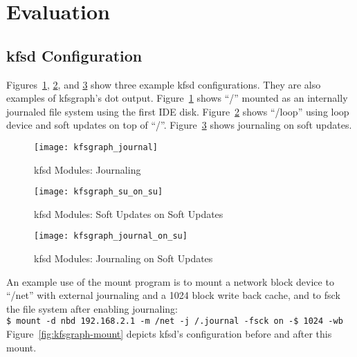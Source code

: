 \section{Evaluation}
\label{sec:eval}

\subsection{kfsd Configuration}
\label{sec:eval:configuration}

\newcommand{\kfsgraphscale}{0.5}

Figures~\ref{fig:kfsgraph-journal}, \ref{fig:kfsgraph-su-on-su}, and
\ref{fig:kfsgraph-journal-on-su} show three example kfsd configurations. They
are also examples of kfsgraph's dot output. Figure~\ref{fig:kfsgraph-journal}
shows ``/'' mounted as an internally journaled file system using the first IDE
disk. Figure~\ref{fig:kfsgraph-su-on-su} shows ``/loop'' using loop device and
soft updates on top of ``/''. Figure~\ref{fig:kfsgraph-journal-on-su} shows
journaling on soft updates.

\begin{figure}[htb]
\begin{center}
  \texttt{[image: kfsgraph\_journal]}
  \caption{kfsd Modules: Journaling}
  \label{fig:kfsgraph-journal}
\end{center}
\end{figure}

\begin{figure}[htb]
\begin{center}
  \texttt{[image: kfsgraph\_su\_on\_su]}
  \caption{kfsd Modules: Soft Updates on Soft Updates}
  \label{fig:kfsgraph-su-on-su}
\end{center}
\end{figure}

\begin{figure}[htb]
\begin{center}
  \texttt{[image: kfsgraph\_journal\_on\_su]}
  \caption{kfsd Modules: Journaling on Soft Updates}
  \label{fig:kfsgraph-journal-on-su}
\end{center}
\end{figure}

An example use of the mount program is to mount a network block device to
``/net'' with external journaling and a 1024 block write back cache, and to
fsck the file system after enabling journaling:\\
\indent \texttt{\$ mount -d nbd 192.168.2.1 -m /net -j /.journal -fsck on -\$ 1024 -wb}\\
Figure~\ref{fig:kfsgraph-mount} depicts kfsd's configuration before and after
this mount.

